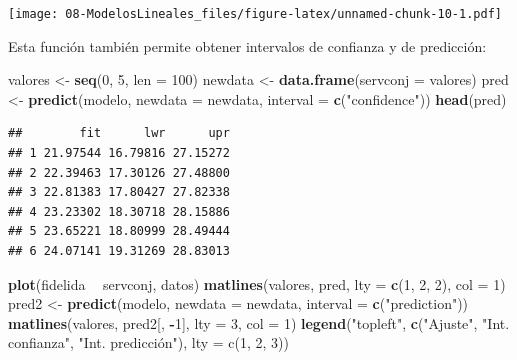 \documentclass[]{book}
\newenvironment{Shaded}{\begin{snugshade}}{\end{snugshade}}
\newcommand{\KeywordTok}[1]{\textcolor[rgb]{0.13,0.29,0.53}{\textbf{#1}}}
\newcommand{\DataTypeTok}[1]{\textcolor[rgb]{0.13,0.29,0.53}{#1}}
\newcommand{\DecValTok}[1]{\textcolor[rgb]{0.00,0.00,0.81}{#1}}
\newcommand{\StringTok}[1]{\textcolor[rgb]{0.31,0.60,0.02}{#1}}
\newcommand{\OperatorTok}[1]{\textcolor[rgb]{0.81,0.36,0.00}{\textbf{#1}}}
\newcommand{\NormalTok}[1]{#1}
\begin{document}
\texttt{[image: 08-ModelosLineales\_files/figure-latex/unnamed-chunk-10-1.pdf]}

Esta función también permite obtener intervalos de confianza y de
predicción:

\begin{Shaded}
\begin{Highlighting}[]
\NormalTok{valores <-}\StringTok{ }\KeywordTok{seq}\NormalTok{(}\DecValTok{0}\NormalTok{, }\DecValTok{5}\NormalTok{, }\DataTypeTok{len =} \DecValTok{100}\NormalTok{)}
\NormalTok{newdata <-}\StringTok{ }\KeywordTok{data.frame}\NormalTok{(}\DataTypeTok{servconj =}\NormalTok{ valores)}
\NormalTok{pred <-}\StringTok{ }\KeywordTok{predict}\NormalTok{(modelo, }\DataTypeTok{newdata =}\NormalTok{ newdata, }\DataTypeTok{interval =} \KeywordTok{c}\NormalTok{(}\StringTok{"confidence"}\NormalTok{))}
\KeywordTok{head}\NormalTok{(pred)}
\end{Highlighting}
\end{Shaded}

\begin{verbatim}
##        fit      lwr      upr
## 1 21.97544 16.79816 27.15272
## 2 22.39463 17.30126 27.48800
## 3 22.81383 17.80427 27.82338
## 4 23.23302 18.30718 28.15886
## 5 23.65221 18.80999 28.49444
## 6 24.07141 19.31269 28.83013
\end{verbatim}

\begin{Shaded}
\begin{Highlighting}[]
\KeywordTok{plot}\NormalTok{(fidelida }\OperatorTok{~}\StringTok{ }\NormalTok{servconj, datos)}
\KeywordTok{matlines}\NormalTok{(valores, pred, }\DataTypeTok{lty =} \KeywordTok{c}\NormalTok{(}\DecValTok{1}\NormalTok{, }\DecValTok{2}\NormalTok{, }\DecValTok{2}\NormalTok{), }\DataTypeTok{col =} \DecValTok{1}\NormalTok{)}
\NormalTok{pred2 <-}\StringTok{ }\KeywordTok{predict}\NormalTok{(modelo, }\DataTypeTok{newdata =}\NormalTok{ newdata, }\DataTypeTok{interval =} \KeywordTok{c}\NormalTok{(}\StringTok{"prediction"}\NormalTok{))}
\KeywordTok{matlines}\NormalTok{(valores, pred2[, }\OperatorTok{-}\DecValTok{1}\NormalTok{], }\DataTypeTok{lty =} \DecValTok{3}\NormalTok{, }\DataTypeTok{col =} \DecValTok{1}\NormalTok{)}
\KeywordTok{legend}\NormalTok{(}\StringTok{"topleft"}\NormalTok{, }\KeywordTok{c}\NormalTok{(}\StringTok{"Ajuste"}\NormalTok{, }\StringTok{"Int. confianza"}\NormalTok{, }\StringTok{"Int. predicción"), lty = c(1, 2, 3))}
\end{Highlighting}
\end{Shaded}
\end{document}
